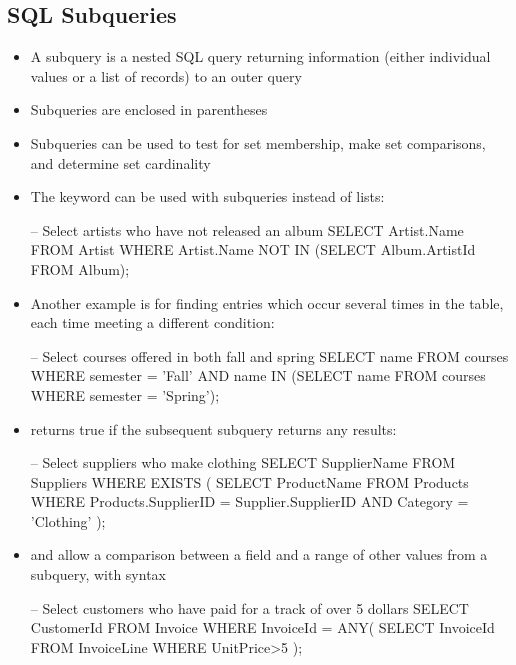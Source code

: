 \documentclass[a4paper]{article}
\begin{document}
\subsection{SQL Subqueries}
\begin{itemize}
    \item A subquery is a nested SQL query returning information (either individual values or a list of records) to an outer query
    \item Subqueries are enclosed in parentheses
    \item Subqueries can be used to test for set membership, make set comparisons, and determine set cardinality
    \item The  keyword can be used with subqueries instead of lists:
\begin{sql}
-- Select artists who have not released an album
SELECT Artist.Name FROM Artist
WHERE Artist.Name NOT IN
(SELECT Album.ArtistId FROM Album);
\end{sql}
    \item Another example is for finding entries which occur several times in the table, each time meeting a different condition:
\begin{sql}
-- Select courses offered in both fall and spring
SELECT name FROM courses
WHERE semester = 'Fall'
AND name IN
(SELECT name FROM courses
WHERE semester = 'Spring');
\end{sql}
\item {} returns true if the subsequent subquery returns any results:
\begin{sql}
-- Select suppliers who make clothing
SELECT SupplierName FROM Suppliers
WHERE EXISTS (
    SELECT ProductName FROM Products
    WHERE Products.SupplierID = Supplier.SupplierID
    AND Category = 'Clothing'
);
\end{sql}
\item {} and  allow a comparison between a field and a range of other values from a subquery, with syntax 
\begin{sql}
-- Select customers who have paid for a track of over 5 dollars
SELECT CustomerId FROM Invoice
WHERE InvoiceId = ANY(
    SELECT InvoiceId FROM InvoiceLine
    WHERE UnitPrice>5
);
\end{sql}
\end{itemize}
\end{document}
